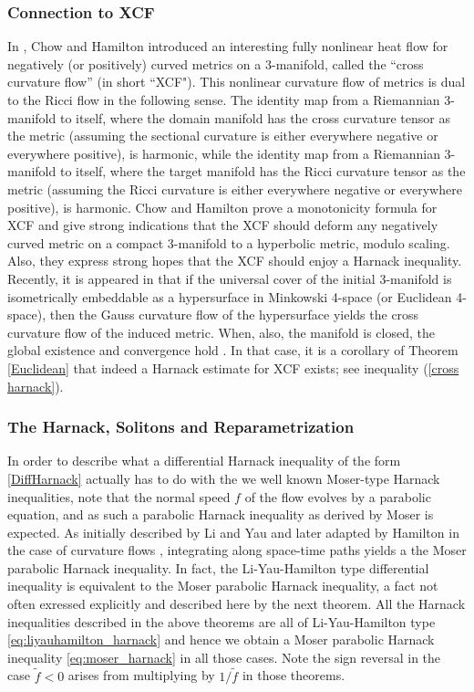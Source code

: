 \subsubsection*{Connection to XCF}
In \cite{ChowHamilton:/2004}, Chow and Hamilton introduced an interesting fully nonlinear heat flow for negatively (or positively) curved metrics on a 3-manifold, called the ``cross curvature flow'' (in short ``XCF"). This nonlinear curvature flow of metrics is dual to the Ricci flow in the following sense. The identity map from a Riemannian 3-manifold to itself, where the domain manifold has the cross curvature tensor as the metric (assuming the sectional curvature is either everywhere negative or everywhere positive), is harmonic, while the identity map from a Riemannian 3-manifold to itself, where the target manifold has the  Ricci curvature tensor as the metric (assuming the Ricci curvature is either everywhere negative or everywhere positive), is harmonic. Chow and Hamilton prove a monotonicity formula for XCF and give strong indications that the XCF should deform any negatively curved metric on a compact 3-manifold to a hyperbolic metric, modulo scaling. Also, they express strong hopes that the XCF should enjoy a Harnack inequality. Recently, it is appeared in \cite{AndrewsChenFangMcCoy:/2015} that if the universal cover of the initial 3-manifold is isometrically embeddable as a hypersurface in Minkowski 4-space (or Euclidean 4-space), then the Gauss curvature flow of the hypersurface yields the cross curvature flow of the induced metric. When, also, the manifold is closed, the global existence and convergence hold \cite{AndrewsChenFangMcCoy:/2015}. In that case, it is a corollary of Theorem \ref{Euclidean} that indeed a Harnack estimate for XCF exists; see inequality (\ref{cross harnack}).

\subsubsection*{The Harnack, Solitons and Reparametrization}
\label{subsec:reparam}
In order to describe what a differential Harnack inequality
of the form \eqref{DiffHarnack} actually has to do with the we well known Moser-type Harnack inequalities, note that
the normal speed $f$ of the flow evolves by a parabolic equation, and as such a parabolic Harnack inequality as derived by Moser \cite{Moser:02/1964} is expected. As initially described by Li and Yau \cite{LiYau:/1986} and later adapted by Hamilton in the case of curvature flows \cite{Hamilton:/1986,Hamilton:/1993,Hamilton:/1995}, integrating along space-time paths yields a the Moser parabolic Harnack inequality. In fact, the Li-Yau-Hamilton type differential inequality is equivalent to the Moser parabolic Harnack inequality, a fact not often exressed explicitly and described here by the next theorem. All the Harnack inequalities described in the above theorems are all of Li-Yau-Hamilton type \eqref{eq:liyauhamilton_harnack} and hence we obtain a Moser parabolic Harnack inequality \eqref{eq:moser_harnack} in all those cases. Note the sign reversal in the case $\tilde{f} < 0$ arises from multiplying by $1/\tilde{f}$ in those theorems.

